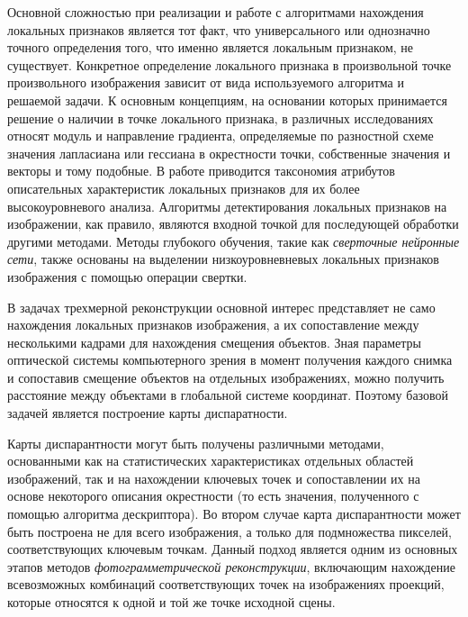 Основной сложностью при реализации и работе с алгоритмами нахождения локальных признаков является тот факт, что универсального или однозначно точного определения того, что именно является локальным признаком, не существует. Конкретное определение локального признака в произвольной точке произвольного изображения зависит от вида используемого алгоритма и решаемой задачи. К основным концепциям, на основании которых принимается решение о наличии в точке локального признака, в различных исследованиях относят модуль и направление градиента, определяемые по разностной схеме значения лапласиана или гессиана в окрестности точки, собственные значения и векторы и тому подобные. В работе  приводится таксономия атрибутов описательных характеристик локальных признаков для их более высокоуровневого анализа. Алгоритмы детектирования локальных признаков на изображении, как правило, являются входной точкой для последующей обработки другими методами. Методы глубокого обучения, такие как \textit{сверточные нейронные сети}, также основаны на выделении низкоуровневневых локальных признаков изображения с помощью операции свертки.

В задачах трехмерной реконструкции основной интерес представляет не само нахождения локальных признаков изображения, а их сопоставление между несколькими кадрами для нахождения смещения объектов. Зная параметры оптической системы компьютерного зрения в момент получения каждого снимка и сопоставив смещение объектов на отдельных изображениях, можно получить расстояние между объектами в глобальной системе координат. Поэтому базовой задачей является построение карты диспаратности.

\begin{SCn}
\end{SCn}

\begin{SCn}
\end{SCn}

Карты диспарантности могут быть получены различными методами, основанными как на статистических характеристиках отдельных областей изображений, так и на нахождении ключевых точек и сопоставлении их на основе некоторого описания окрестности (то есть значения, полученного с помощью алгоритма дескриптора). Во втором случае карта диспарантности может быть построена не для всего изображения, а только для подмножества пикселей, соответствующих ключевым точкам. Данный подход является одним из основных этапов методов \textit{фотограмметрической реконструкции}, включающим нахождение всевозможных комбинаций соответствующих точек на изображениях проекций, которые относятся к одной и той же точке исходной сцены.

